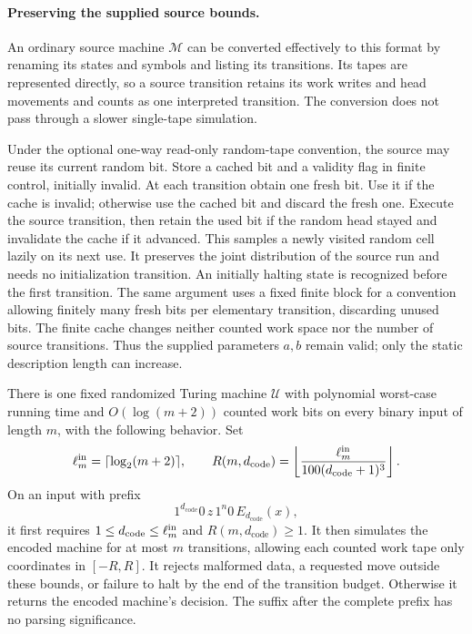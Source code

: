 \paragraph{Preserving the supplied source bounds.}
An ordinary source machine ${\mathcal M}$ can be converted effectively to this format
by renaming its states and symbols and listing its transitions.  Its tapes
are represented directly, so a source transition retains its work writes
and head movements and counts as one interpreted transition.  The
conversion does not pass through a slower single-tape simulation.

Under the optional one-way read-only random-tape convention, the source
may reuse its current random bit. Store a cached bit and a validity flag
in finite control, initially invalid.
At each transition obtain one fresh bit.  Use it if the cache is invalid;
otherwise use the cached bit and discard the fresh one.  Execute the
source transition, then retain the used bit if the random head stayed
and invalidate the cache if it advanced.  This samples a newly visited
random cell lazily on its next use.  It preserves the joint distribution
of the source run and needs no initialization transition.  An initially
halting state is recognized before the first transition.  The same
argument uses a fixed finite block for a convention allowing finitely
many fresh bits per elementary transition, discarding unused bits.
The finite cache changes neither counted work space nor the number of
source transitions.  Thus the supplied parameters $a,b$ remain valid;
only the static description length can increase.

\begin{lemma}
\label{lem:compiler-interpreter}
There is one fixed randomized Turing machine ${\mathcal U}$ with polynomial
worst-case running time and $O(\log(m+2))$ counted work bits on every
binary input of length $m$, with the following behavior.
Set
\begin{equation}\label{eq:compiler-interpreter-cap}
 \ell_m^{\rm in}=\lceil\log_2(m+2)\rceil,
 \qquad
 R(m,d_{\mathrm{code}})
   =\left\lfloor\frac{\ell_m^{\rm in}}
       {100(d_{\mathrm{code}}+1)^3}\right\rfloor.
\end{equation}
On an input with prefix
\begin{equation}\label{eq:compiler-prefix}
  1^{d_{\mathrm{code}}}0\,z\,1^n0\,
  E_{d_{\mathrm{code}}}(x),
\end{equation}
it first requires $1\le d_{\mathrm{code}}\le\ell_m^{\rm in}$ and
$R(m,d_{\mathrm{code}})\ge1$.  It then simulates the encoded machine
for at most $m$ transitions, allowing each counted work tape only
coordinates in $[-R,R]$.  It rejects malformed data, a requested move
outside these bounds, or failure to halt by the end of the transition
budget.  Otherwise it returns the encoded machine's decision.  The
suffix after the complete prefix has no parsing significance.
\end{lemma}

